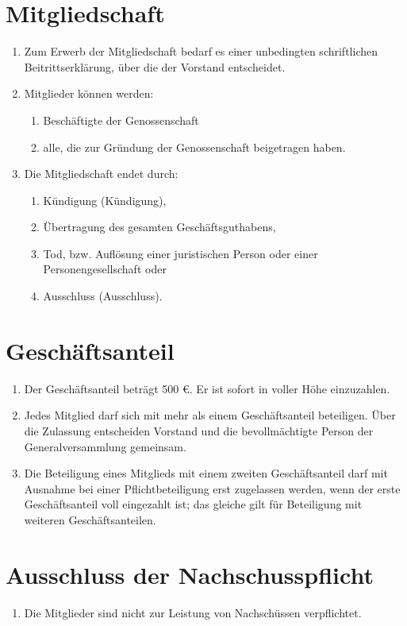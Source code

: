 \documentclass[a4paper, 12pt]{scrartcl}
\begin{document}
\section{Mitgliedschaft}
\begin{enumerate}
  \item Zum Erwerb der Mitgliedschaft bedarf es einer unbedingten schriftlichen Beitrittserklärung, über die der Vorstand entscheidet.
  \item Mitglieder können werden:
    \begin{enumerate}
      \item Beschäftigte der Genossenschaft
      \item alle, die zur Gründung der Genossenschaft beigetragen haben.
    \end{enumerate}
  \item Die Mitgliedschaft endet durch:
  \begin {enumerate}
    \item Kündigung (Kündigung),
    \item Übertragung des gesamten Geschäftsguthabens,
    \item Tod, bzw. Auflösung einer juristischen Person oder einer Personengesellschaft oder
    \item Ausschluss (Ausschluss).
  \end{enumerate}
\end{enumerate}

\section{Geschäftsanteil}
\begin{enumerate}
  \item Der Geschäftsanteil beträgt 500 \euro. Er ist sofort in voller Höhe einzuzahlen.
  \item Jedes Mitglied darf sich mit mehr als einem Geschäftsanteil beteiligen. Über die Zulassung entscheiden Vorstand und die bevollmächtigte Person der Generalversammlung gemeinsam.
  \item Die Beteiligung eines Mitglieds mit einem zweiten Geschäftsanteil darf mit Ausnahme bei einer Pflichtbeteiligung erst zugelassen werden, wenn der erste Geschäftsanteil voll eingezahlt ist; das gleiche gilt für Beteiligung mit weiteren Geschäftsanteilen.
\end{enumerate}

\section{Ausschluss der Nachschusspflicht}
\begin{enumerate}
  \item Die Mitglieder sind nicht zur Leistung von Nachschüssen verpflichtet.
\end{enumerate}
\end{document}
